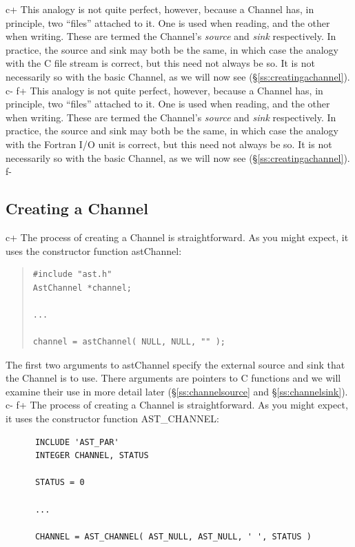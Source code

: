 \documentclass[twoside,11pt]{article}
\newcommand{\secref}[1]{\S\ref{#1}}
\newcommand{\secref}[1]{\ref{#1}}
\begin{document}
c+
This analogy is not quite perfect, however, because a Channel has, in
principle, two ``files'' attached to it. One is used when reading, and
the other when writing. These are termed the Channel's {\em{source}}
and {\em{sink}} respectively. In practice, the source and sink may
both be the same, in which case the analogy with the C file stream is
correct, but this need not always be so. It is not necessarily so with
the basic Channel, as we will now see (\secref{ss:creatingachannel}).
c-
f+
This analogy is not quite perfect, however, because a Channel has, in
principle, two ``files'' attached to it. One is used when reading, and
the other when writing. These are termed the Channel's {\em{source}}
and {\em{sink}} respectively. In practice, the source and sink may
both be the same, in which case the analogy with the Fortran I/O unit
is correct, but this need not always be so. It is not necessarily so
with the basic Channel, as we will now see
(\secref{ss:creatingachannel}).
f-

\subsection{\label{ss:creatingachannel}Creating a Channel}

c+
The process of creating a Channel is straightforward. As you
might expect, it uses the constructor function astChannel:

\begin{quote}
\small
\begin{verbatim}
#include "ast.h"
AstChannel *channel;

...

channel = astChannel( NULL, NULL, "" );
\end{verbatim}
\normalsize
\end{quote}

The first two arguments to astChannel specify the external source and
sink that the Channel is to use. There arguments are pointers to C
functions and we will examine their use in more detail later
(\secref{ss:channelsource} and \secref{ss:channelsink}).
c-
f+
The process of creating a Channel is straightforward. As you
might expect, it uses the constructor function AST\_CHANNEL:

\small
\begin{verbatim}
      INCLUDE 'AST_PAR'
      INTEGER CHANNEL, STATUS

      STATUS = 0

      ...

      CHANNEL = AST_CHANNEL( AST_NULL, AST_NULL, ' ', STATUS )
\end{verbatim}
\normalsize
\end{document}
